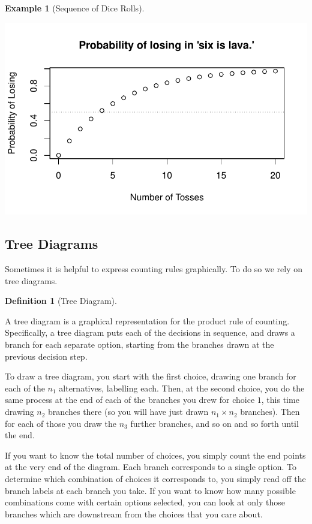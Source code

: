 \documentclass[
  letterpaper,
  DIV=11,
  numbers=noendperiod]{scrreprt}
\theoremstyle{definition}
\theoremstyle{definition}
\newtheorem{example}{Example}[chapter]
\theoremstyle{definition}
\newtheorem{definition}{Definition}[chapter]
\theoremstyle{remark}
\begin{document}
\begin{example}[Sequence of Dice
Rolls]
\begin{tcolorbox}[enhanced jigsaw, colback=white, colframe=quarto-callout-color-frame, arc=.35mm, leftrule=.75mm, rightrule=.15mm, opacityback=0, breakable, bottomrule=.15mm, left=2mm, toprule=.15mm]
\includegraphics{notes/chapter3_files/figure-pdf/unnamed-chunk-2-1.pdf}

\end{tcolorbox}

\end{example}

\subsection{Tree Diagrams}\label{tree-diagrams}

Sometimes it is helpful to express counting rules graphically. To do so
we rely on tree diagrams.

\begin{definition}[Tree
Diagram]\protect\hypertarget{def-tree-diagram}{}\label{def-tree-diagram}

A tree diagram is a graphical representation for the product rule of
counting. Specifically, a tree diagram puts each of the decisions in
sequence, and draws a branch for each separate option, starting from the
branches drawn at the previous decision step.

\end{definition}

To draw a tree diagram, you start with the first choice, drawing one
branch for each of the \(n_1\) alternatives, labelling each. Then, at
the second choice, you do the same process at the end of each of the
branches you drew for choice \(1\), this time drawing \(n_2\) branches
there (so you will have just drawn \(n_1\times n_2\) branches). Then for
each of those you draw the \(n_3\) further branches, and so on and so
forth until the end.

If you want to know the total number of choices, you simply count the
end points at the very end of the diagram. Each branch corresponds to a
single option. To determine which combination of choices it corresponds
to, you simply read off the branch labels at each branch you take. If
you want to know how many possible combinations come with certain
options selected, you can look at only those branches which are
downstream from the choices that you care about.
\end{document}
